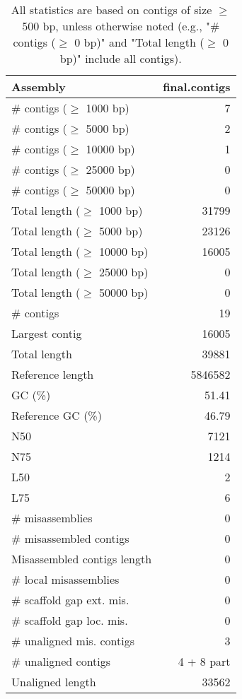 \documentclass[12pt,a4paper]{article}
\begin{document}
\begin{table}[ht]
\begin{center}
\caption{All statistics are based on contigs of size $\geq$ 500 bp, unless otherwise noted (e.g., "\# contigs ($\geq$ 0 bp)" and "Total length ($\geq$ 0 bp)" include all contigs).}
\begin{tabular}{|l*{1}{|r}|}
\hline
Assembly & final.contigs \\ \hline
\# contigs ($\geq$ 1000 bp) & 7 \\ \hline
\# contigs ($\geq$ 5000 bp) & 2 \\ \hline
\# contigs ($\geq$ 10000 bp) & 1 \\ \hline
\# contigs ($\geq$ 25000 bp) & 0 \\ \hline
\# contigs ($\geq$ 50000 bp) & 0 \\ \hline
Total length ($\geq$ 1000 bp) & 31799 \\ \hline
Total length ($\geq$ 5000 bp) & 23126 \\ \hline
Total length ($\geq$ 10000 bp) & 16005 \\ \hline
Total length ($\geq$ 25000 bp) & 0 \\ \hline
Total length ($\geq$ 50000 bp) & 0 \\ \hline
\# contigs & 19 \\ \hline
Largest contig & 16005 \\ \hline
Total length & 39881 \\ \hline
Reference length & 5846582 \\ \hline
GC (\%) & 51.41 \\ \hline
Reference GC (\%) & 46.79 \\ \hline
N50 & 7121 \\ \hline
N75 & 1214 \\ \hline
L50 & 2 \\ \hline
L75 & 6 \\ \hline
\# misassemblies & 0 \\ \hline
\# misassembled contigs & 0 \\ \hline
Misassembled contigs length & 0 \\ \hline
\# local misassemblies & 0 \\ \hline
\# scaffold gap ext. mis. & 0 \\ \hline
\# scaffold gap loc. mis. & 0 \\ \hline
\# unaligned mis. contigs & 3 \\ \hline
\# unaligned contigs & 4 + 8 part \\ \hline
Unaligned length & 33562 \\ \hline

\end{tabular}
\end{center}
\end{table}
\end{document}
